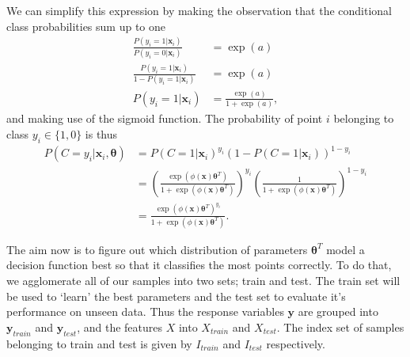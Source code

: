   We can simplify this expression by making the observation that the conditional class probabilities sum up to one
  \begin{align}
	\frac{P(y_i=1 |  \mathbf{x}_i)}{P(y_i = 0 |  \mathbf{x}_i)} &= \exp(a)\\
	\frac{P(y_i=1 |  \mathbf{x}_i)}{1-P(y_i=1 |  \mathbf{x}_i)} &= \exp(a)\\
	P(y_i=1 |  \mathbf{x}_i) &= \frac{\exp(a)}{1+\exp(a)},
  \end{align}
  and making use of the sigmoid function. The probability of point $i$ belonging to class $y_i \in \{1,0\}$  is thus
    \begin{align}
  	P(C = y_i |  \mathbf{x}_i, \bm{\theta}) &= P(C=1 |  \mathbf{x}_i)^{y_i}(1-P(C=1 |  \mathbf{x}_i))^{1-y_i}\nonumber\\
	&= \left(\frac{\exp(\phi( \mathbf{x}) \bm{\theta}^T)}{1+\exp(\phi( \mathbf{x}) \bm{\theta}^T)}\right)^{y_i}\left(\frac{1}{1+\exp(\phi( \mathbf{x}) \bm{\theta}^T)}\right)^{1-y_i} \nonumber\\
	&=\frac{\exp(\phi( \mathbf{x}) \bm{\theta}^T)^{y_i}}{1+\exp(\phi( \mathbf{x}) \bm{\theta}^T)}. \label{eq:singlelikelihood}
  \end{align}

  
  
  The aim now is to figure out which distribution of parameters $ \bm{\theta}^T$ model a decision function best so that it classifies the most points correctly. To do that, we agglomerate all of our samples into two sets; train and test. The train set will be used to `learn' the best parameters and the test set to evaluate it's performance on unseen data. Thus the response variables $\mathbf{y}$ are grouped into $ \mathbf{y}_{train}$ and $ \mathbf{y}_{test} $, and the features $X$ into ${X}_{train}$ and $X_{test}$. The index set of samples belonging to train and test is given by $I_{train}$ and $I_{test}$ respectively.
  
